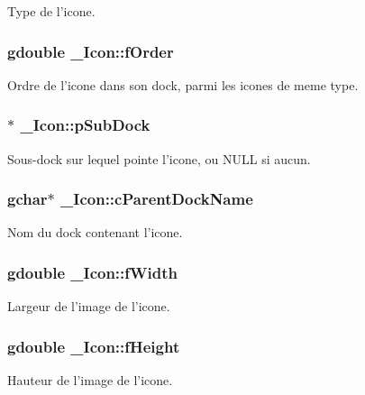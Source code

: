 Type de l'icone. 

\subsubsection{\setlength{\rightskip}{0pt plus 5cm}gdouble {\bf \_\-Icon::fOrder}}\label{struct__Icon_0dda24b79deea43680dc5180fa1ac8ac}


Ordre de l'icone dans son dock, parmi les icones de meme type. 

\subsubsection{$\ast$ {\bf \_\-Icon::pSubDock}}\label{struct__Icon_cbc2b0e5614570016c33f6be44e9f866}


Sous-dock sur lequel pointe l'icone, ou NULL si aucun. 

\subsubsection{\setlength{\rightskip}{0pt plus 5cm}gchar$\ast$ {\bf \_\-Icon::cParentDockName}}\label{struct__Icon_3a79d44f8a7ff21cb0d73f5570a35266}


Nom du dock contenant l'icone. 

\subsubsection{\setlength{\rightskip}{0pt plus 5cm}gdouble {\bf \_\-Icon::fWidth}}\label{struct__Icon_1601cdc5344f5ee7e399c6b1a65feb50}


Largeur de l'image de l'icone. 

\subsubsection{\setlength{\rightskip}{0pt plus 5cm}gdouble {\bf \_\-Icon::fHeight}}\label{struct__Icon_5849393004f8412ac1468827b7e810f3}


Hauteur de l'image de l'icone. 

